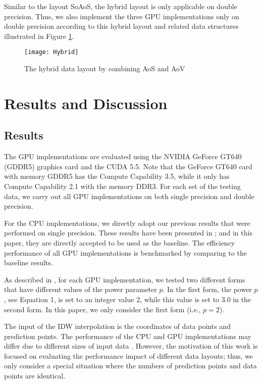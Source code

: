 Similar to the layout SoAoS, the hybrid layout is only applicable on double 
precision. Thus, we also implement the three GPU implementations only on 
double precision according to this hybrid layout and related data structures 
illustrated in Figure \ref{fig:layout:hybrid}.


\begin{figure}[htb]
\centering
    \texttt{[image: Hybrid]}
    \caption{The hybrid data layout by combining AoS and AoV}
    \label{fig:layout:hybrid}       \end{figure}


\section{Results and Discussion}
\label{sec:result:and:discuss}


\subsection{Results}
\label{sec:result}

The GPU implementations are evaluated using the NVIDIA GeForce GT640 (GDDR5) 
graphics card and the CUDA 5.5. Note that the GeForce GT640 card with 
memory GDDR5 has the Compute Capability 3.5, while it only has Compute 
Capability 2.1 with the memory DDR3. For each set of the testing data, we 
carry out all GPU implementations on both single precision and double 
precision. 

For the CPU implementations, we directly adopt our previous results that 
were performed on single precision. These results have been presented in \cite{mei2014}; and in this paper, they are directly accepted to be used as the 
baseline. The efficiency performance of all GPU implementations is 
benchmarked by comparing to the baseline results.

As described in \cite{mei2014}, for each GPU implementation, we tested two 
different forms that have different values of the power parameter $p$. In the 
first form, the power $p$, see Equation 1, is set to an integer value 2, while 
this value is set to 3.0 in the second form. In this paper, we only consider 
the first form (i.e., $p = 2$).

The input of the IDW interpolation is the coordinates of data points and 
prediction points. The performance of the CPU and GPU implementations may 
differ due to different sizes of input data \cite{hanzer2012,hennebohl2011}. However, the 
motivation of this work is focused on evaluating the performance impact of 
different data layouts; thus, we only consider a special situation where the 
numbers of prediction points and data points are identical.

